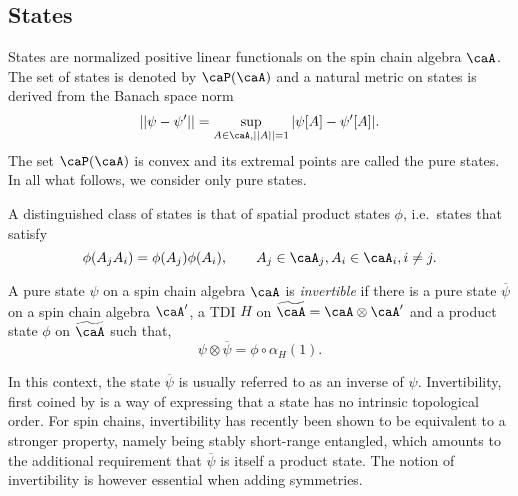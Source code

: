 \subsection{States}\label{sec: states}

States are normalized positive linear functionals on the spin chain algebra $\caA$. The set of states is denoted by $\caP(\caA)$ and a natural metric on states is derived from the Banach space norm
\begin{equation}\label{eq: metric on states}
||\psi-\psi'|| = \sup_{A \in\caA, ||A||=1} |\psi[A]-\psi'[A]|.
\end{equation}
The set $\caP(\caA)$ is convex and its extremal points are called the pure states. In all what follows, we consider only pure states.

A distinguished class of states is that of spatial product states $\phi$, i.e.\ states that satisfy
$$
\phi(A_jA_i)= \phi(A_j)\phi( A_i),\qquad  A_j \in\caA_j,A_i\in \caA_i, i\neq j.
$$  
%
%
%

%
%
%
\begin{definition}
	A pure state $\psi$ on a spin chain algebra $\caA$ is \emph{invertible} if there is a pure state $\overline{\psi}$ on a spin chain algebra $\caA'$, a TDI $H$ on $\widetilde \caA= \caA \otimes \caA'$ and a product state $\phi$ on $\widetilde \caA$ such that, 
	\begin{equation}\label{eq: def invertibility}
	\psi\otimes\overline{\psi} =\phi \circ \alpha_H(1).
	\end{equation}
\end{definition}
%
%
%
In this context, the state $\overline{\psi}$ is usually referred to as an inverse of $\psi$.  Invertibility, first coined by \cite{KitaevConf} is a way of expressing that a state has no intrinsic topological order. For spin chains, invertibility has recently been shown \cite{kapustin2021classification} to be equivalent to a stronger property, namely being stably short-range entangled, which amounts to the additional requirement that $\overline{\psi}$ is itself a product state. The notion of invertibility is however essential when adding symmetries. 


